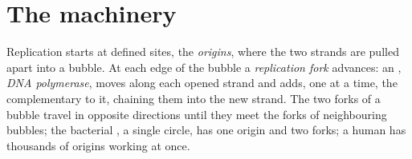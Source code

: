 \section{The machinery}

\begin{proposition}\label{prop:g11:dna-replication:forks}
Replication starts at defined sites, the \emph{origins}, where the two
strands are pulled apart into a bubble. At each edge of the bubble a
\emph{replication fork} advances: an ,
\emph{DNA polymerase}, moves along each opened
strand and adds, one at a time, the  complementary to it,
chaining them into the new strand. The two forks of a bubble travel in
opposite directions until they meet the forks of neighbouring bubbles;
the bacterial , a single circle, has one origin and two
forks; a human  has thousands of origins working at once.
\end{proposition}
\admitted

